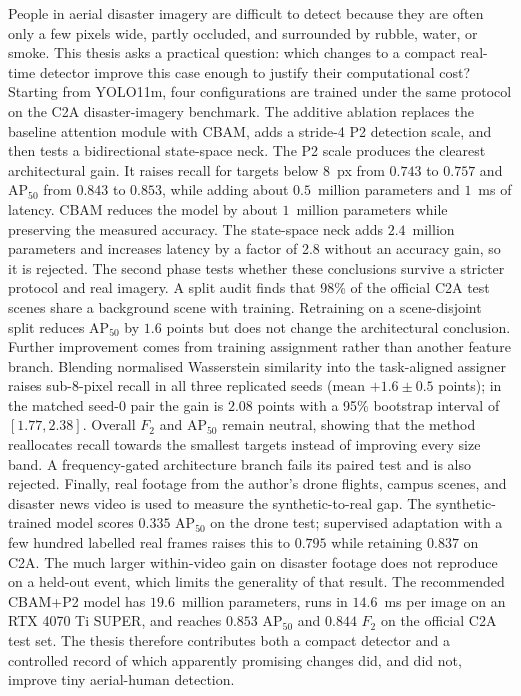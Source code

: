 
People in aerial disaster imagery are difficult to detect because they are
often only a few pixels wide, partly occluded, and surrounded by rubble, water,
or smoke. This thesis asks a practical question: which changes to a compact
real-time detector improve this case enough to justify their computational
cost? Starting from YOLO11m, four configurations are trained under the same
protocol on the C2A disaster-imagery benchmark. The additive ablation replaces
the baseline attention module with CBAM, adds a stride-4 P2 detection scale,
and then tests a bidirectional state-space neck. The P2 scale produces the
clearest architectural gain. It raises recall for targets below 8~px from
$0.743$ to $0.757$ and $\mathrm{AP}_{50}$ from $0.843$ to $0.853$, while adding
about $0.5$~million parameters and $1$~ms of latency. CBAM reduces the model by
about $1$~million parameters while preserving the measured accuracy. The
state-space neck adds $2.4$~million parameters and increases latency by a
factor of 2.8 without an accuracy gain, so it is rejected.
The second phase tests whether these conclusions survive a stricter protocol
and real imagery. A split audit finds that 98\% of the official C2A test scenes
share a background scene with training. Retraining on a scene-disjoint split
reduces $\mathrm{AP}_{50}$ by $1.6$ points but does not change the architectural
conclusion. Further improvement comes from training assignment rather than
another feature branch. Blending normalised Wasserstein similarity into the
task-aligned assigner raises sub-8-pixel recall in all three replicated seeds
(mean $+1.6\pm0.5$ points); in the matched seed-0 pair the gain is $2.08$
points with a 95\% bootstrap interval of $[1.77,2.38]$. Overall $F_2$ and
$\mathrm{AP}_{50}$ remain neutral, showing that the method reallocates recall
towards the smallest targets instead of improving every size band. A
frequency-gated architecture branch fails its paired test and is also rejected.
Finally, real footage from the author's drone flights, campus scenes, and
disaster news video is used to measure the synthetic-to-real gap. The
synthetic-trained model scores $0.335$ $\mathrm{AP}_{50}$ on the drone test;
supervised adaptation with a few hundred labelled real frames raises this to
$0.795$ while retaining $0.837$ on C2A. The much larger within-video gain on
disaster footage does not reproduce on a held-out event, which limits the
generality of that result. The recommended CBAM+P2 model has $19.6$~million
parameters, runs in $14.6$~ms per image on an RTX 4070 Ti SUPER, and reaches
$0.853$ $\mathrm{AP}_{50}$ and $0.844$ $F_2$ on the official C2A test set. The
thesis therefore contributes both a compact detector and a controlled
record of which apparently promising changes did, and did not, improve tiny
aerial-human detection.
